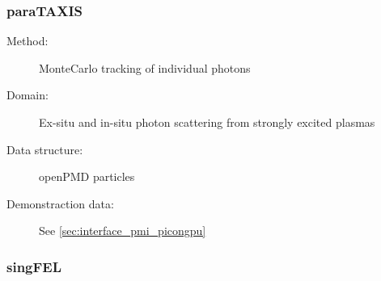 \documentclass[12pt]{scrartcl}
\begin{document}
\subsubsection{paraTAXIS\label{sec:interface_scat_parataxis}}
\begin{description}
  \item[Method:] MonteCarlo tracking of individual photons
  \item[Domain:] Ex-situ and in-situ photon scattering from strongly excited
    plasmas
  \item[Data structure:] openPMD particles
  \item[Demonstraction data:] See \ref{sec:interface_pmi_picongpu}
\end{description}

\subsubsection{singFEL\label{sec:interface_diffr_singfel} }
\end{document}
